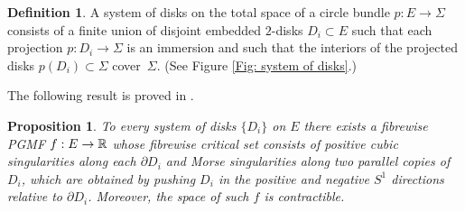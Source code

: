\documentclass[11pt]{article}
\numberwithin{equation}{section}\providecommand{\dpl}{\displaystyle}
\theoremstyle{plain}
\newtheorem{proposition}[theorem]{Proposition}
\theoremstyle{definition}
\newtheorem{definition}[theorem]{Definition}
\begin{document}
\begin{definition}
A system of disks on the total space of a circle bundle \hbox{$p:E\!\to\!\Sigma$} consists of a finite union of disjoint embedded $2$-disks $D_i \subset E$ such that each projection \hbox{$p:D_i \to \Sigma$} is an immersion and such that the interiors of the projected disks \hbox{$p(D_i) \subset \Sigma$} cover~$\Sigma$. (See Figure \ref{Fig: system of disks}.)
\end{definition}

The following result is proved in \cite{IK93}.

\begin{proposition}\label{systems}
To every system of disks $\{ D_i \}$ on $E$ there exists a fibrewise PGMF $f:E \to \mathbb{R}$ whose fibrewise critical set consists of positive cubic singularities along each $\partial D_i$ and Morse singularities along two parallel copies of $D_i$, which are obtained by pushing $D_i$ in the positive and negative $S^1$ directions relative to $\partial D_i$. Moreover, the space of such $f$ is contractible.
\end{proposition}
\end{document}
